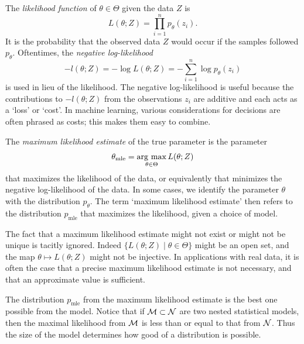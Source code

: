 \documentclass[cclicense]{hmcthesis}
\newcommand*{\mle}{\mathrm{mle}}
\numberwithin{equation}{chapter}
\numberwithin{ucounter}{chapter}
\begin{document}
    \begin{definition}
        The \emph{likelihood function} of $\theta \in \Theta$ given the data $Z$
        is
        \[
            L(\theta; Z) = \prod_{i=1}^n p_\theta(z_i).
        \]
        It is the probability that the observed data $Z$ would occur if the
        samples followed $p_\theta$.  Oftentimes, the \emph{negative
        log-likelihood}
        \begin{equation}
            -l(\theta; Z) = -\log L(\theta; Z) = -\sum_{i=1}^n \log p_\theta(z_i)
            \label{eq:negloglik}
        \end{equation}
        is used in lieu of the likelihood.  The negative log-likelihood is
        useful because the contributions to $-l(\theta; Z)$ from the
        observations $z_i$ are additive and each acts as a `loss' or `cost'.
        In machine learning, various considerations for decisions are often
        phrased as costs; this makes them easy to combine.
    \end{definition}
    \begin{definition}
    The \emph{maximum likelihood estimate} of the true parameter is the
    parameter 
    \[
        \theta_\mle = \argmax_{\theta \in \Theta} L(\theta; Z)
    \]
    that maximizes the likelihood of the data, or equivalently that minimizes
    the negative log-likelihood of the data.  In some cases, we identify the
    parameter $\theta$ with the distribution $p_\theta$. The term `maximum
    likelihood estimate' then refers to the distribution $p_\mle$ that maximizes
    the likelihood, given a choice of model.
    \end{definition}

    The fact that a maximum likelihood estimate might not exist or might not be
    unique is tacitly ignored.  Indeed $\{L(\theta; Z) \mid \theta \in \Theta\}$
    might be an open set, and the map $\theta \mapsto L(\theta; Z)$ might not be
    injective.  In applications with real data, it is often the case that a
    precise maximum likelihood estimate is not necessary, and that an
    approximate value is sufficient.

    The distribution $p_\mle$ from the maximum likelihood estimate is the best
    one possible from the model.  Notice that if $\mathcal{M} \subset \mathcal{N}$ are two
    nested statistical models, then the maximal likelihood from $\mathcal{M}$ is less
    than or equal to that from $\mathcal{N}$.  Thus the size of the model determines how
    good of a distribution is possible.
\end{document}
